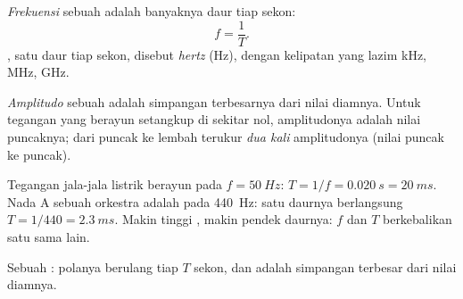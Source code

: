 \begin{definition}[Frekuensi]\label{def:g10:signals-and-waves:frequency}
\emph{Frekuensi} sebuah  adalah
banyaknya daur tiap sekon:
\[
f = \frac{1}{T} .
\]
, satu daur tiap sekon, disebut \emph{hertz}
(\unit{Hz}), dengan kelipatan yang lazim \unit{kHz}, \unit{MHz},
\unit{GHz}.
\end{definition}

\begin{definition}[Amplitudo]\label{def:g10:signals-and-waves:amplitude}
\emph{Amplitudo} sebuah  adalah
simpangan terbesarnya dari nilai diamnya. Untuk tegangan yang berayun
setangkup di sekitar nol, amplitudonya adalah nilai puncaknya; dari
puncak ke lembah terukur \emph{dua kali} amplitudonya (nilai puncak ke
puncak).
\end{definition}

\begin{example}\label{ex:g10:signals-and-waves:mains}
Tegangan jala-jala listrik berayun pada $f = \qty{50}{Hz}$: 
$T = 1/f = \qty{0.020}{s} = \qty{20}{ms}$. Nada A sebuah orkestra adalah
  pada \qty{440}{Hz}: satu daurnya berlangsung
$T = 1/440 = \qty{2.3}{ms}$. Makin tinggi , makin pendek
daurnya: $f$ dan $T$ berkebalikan satu sama lain.
\end{example}

\begin{omfigure}

{\small Sebuah : polanya berulang tiap $T$ sekon, dan
 adalah simpangan terbesar dari nilai diamnya.}
\end{omfigure}

